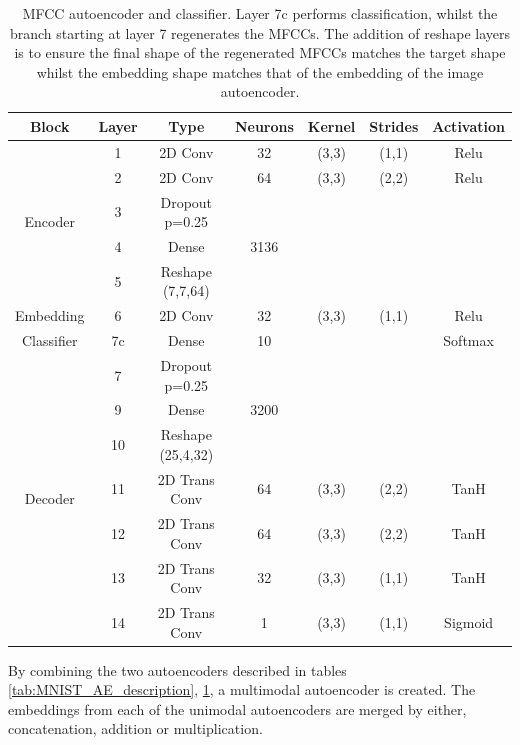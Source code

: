 	\begin{table}[t]
		\centering
		\begin{tabular}{|c|c|c|c|c|c|c|}
			\hline
			Block & Layer & Type & Neurons & Kernel & Strides & Activation  \\ \hline
			\multirow{5}{*}{Encoder} & 1	&	2D Conv & 32 & (3,3) & (1,1)  & Relu\\ \cline{2-7}
			& 2	&	2D Conv & 64 & (3,3) & (2,2)  & Relu\\ \cline{2-7}
			& 3 	&	Dropout p=0.25 &	 & 	     &        & \\ \cline{2-7}
			& 4	&	Dense          & 3136 & 	 &        & \\ \cline{2-7}
			& 5   &	Reshape (7,7,64) &    &     &        & \\ \hline
			Embedding & 6	&	2D Conv & 32 & (3,3) & (1,1)  & Relu  \\ \hline
			Classifier & 7c	&	Dense          & 10 &       &        & Softmax \\ \hline
			\multirow{7}{*}{Decoder} & 7 	&	Dropout p=0.25 &	 & 	     &        & \\ \cline{2-7}
			& 9	&	Dense			& 3200 &     &        & \\ \cline{2-7}
			& 10	&	Reshape (25,4,32) &    &    &        & \\ \cline{2-7}
			& 11	&	2D Trans Conv & 64 & (3,3) & (2,2)  & TanH \\ \cline{2-7}
			& 12	&	2D Trans Conv & 64 & (3,3) & (2,2)  & TanH \\ \cline{2-7}
			& 13	&	2D Trans Conv & 32 & (3,3) & (1,1)  & TanH \\ \cline{2-7}
			& 14	&	2D Trans Conv & 1 & (3,3) & (1,1) & Sigmoid \\ \hline
		\end{tabular}
		\caption{MFCC autoencoder and classifier. Layer 7c performs classification, whilst the branch starting at layer 7 regenerates the MFCCs. The addition of reshape layers is to ensure the final shape of the regenerated MFCCs matches the target shape whilst the embedding shape matches that of the embedding of the image autoencoder.}
		\label{tab:UCU_AE_description}
	\end{table}

By combining the two autoencoders described in tables \ref{tab:MNIST_AE_description}, \ref{tab:UCU_AE_description}, a multimodal autoencoder is created. The embeddings from each of the unimodal autoencoders are merged by either, concatenation, addition or multiplication.
 
